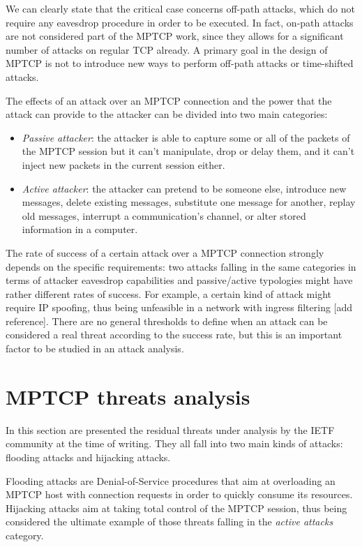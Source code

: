 We can clearly state that the critical case concerns off-path attacks, which do not require any eavesdrop procedure in order to be executed. In fact, on-path attacks are not considered part of the MPTCP work, since they allows for a significant number of attacks on regular TCP already. A primary goal in the design of MPTCP is not to introduce new ways to perform off-path attacks or time-shifted attacks.

The effects of an attack over an MPTCP connection and the power that the attack can provide to the attacker can be divided into two main categories:

\begin{itemize}  
\item \textit{Passive attacker}: the attacker is able to capture some or all of the packets of the MPTCP session but it can't manipulate, drop or delay them, and it can't inject new packets in the current session either.
\item \textit{Active attacker}: the attacker can pretend to be someone else, introduce new messages, delete existing messages, substitute one message for another, replay old messages, interrupt a communication’s channel, or alter stored information in a computer.
\end{itemize}

The rate of success of a certain attack over a MPTCP connection strongly depends on the specific requirements: two attacks falling in the same categories in terms of attacker eavesdrop capabilities and passive/active typologies might have rather different rates of success. For example, a certain kind of attack might require IP spoofing, thus being unfeasible in a network with ingress filtering [add reference].
There are no general thresholds to define when an attack can be considered a real threat according to the success rate, but this is an important factor to be studied in an attack analysis.

\section{MPTCP threats analysis}
In this section are presented the residual threats under analysis by the IETF community at the time of writing. They all fall into two main kinds of attacks: flooding attacks and hijacking attacks. 

Flooding attacks are Denial-of-Service procedures that aim at overloading an MPTCP host with connection requests in order to quickly consume its resources.
Hijacking attacks aim at taking total control of the MPTCP session, thus being considered the ultimate example of those threats falling in the \textit{active attacks} category.


